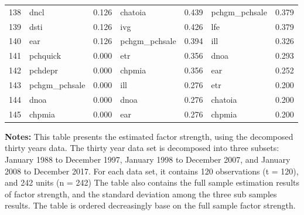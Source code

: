 \begin{footnotesize}
\begin{longtable}{r|lc|lc|lc}
  138 & dncl & 0.126 & chatoia & 0.439 & pchgm\_pchsale & 0.379 \\ 
  139 & dsti & 0.126 & ivg & 0.426 & lfe & 0.379 \\ 
  140 & ear & 0.126 & pchgm\_pchsale & 0.394 & ill & 0.326 \\ 
  141 & pchquick & 0.000 & etr & 0.356 & dnoa & 0.293 \\ 
  142 & pchdepr & 0.000 & chpmia & 0.356 & ear & 0.252 \\ 
  143 & pchgm\_pchsale & 0.000 & ill & 0.276 & etr & 0.200 \\ 
  144 & dnoa & 0.000 & dnoa & 0.276 & chatoia & 0.200 \\ 
  145 & chpmia & 0.000 & ear & 0.276 & chpmia & 0.200 \\          \hline




\end{longtable}
			\begin{minipage}{\textwidth}
	{\footnotesize {\bf Notes:}	This table presents the estimated factor strength, using the decomposed thirty years data.
	The thirty year data set is decomposed into three subsets: January 1988 to December 1997, January 1998 to December 2007, and January 2008 to December 2017. For each data set, it contains 120 observations (t = 120), and 242 units (n = 242)
The table also contains the full sample estimation results of factor strength, and the standard deviation among the three sub samples results.
The table is ordered decreasingly base on the full sample factor strength.}
\end{minipage}
\end{footnotesize}



